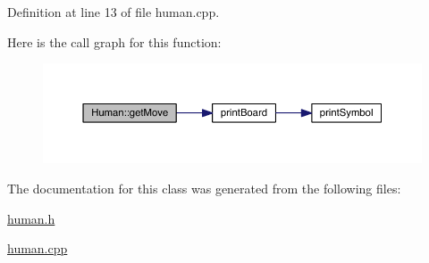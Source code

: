 Definition at line 13 of file human.\+cpp.

Here is the call graph for this function\+:\nopagebreak
\begin{figure}[H]
\begin{center}
\leavevmode
\includegraphics[width=350pt]{class_human_a61228d0fbea51c587ea5383d84b152d8_cgraph}
\end{center}
\end{figure}


The documentation for this class was generated from the following files\+:\begin{DoxyCompactItemize}
\item 
\hyperlink{human_8h}{human.\+h}\item 
\hyperlink{human_8cpp}{human.\+cpp}\end{DoxyCompactItemize}
